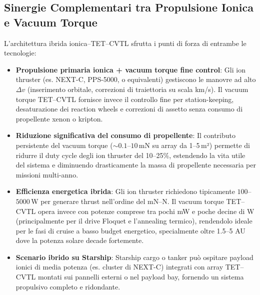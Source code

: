 \documentclass[11pt,a4paper]{article}
\theoremstyle{plain}
\theoremstyle{definition}
\begin{document}
\vspace{0.7cm}



\subsection{Sinergie Complementari tra Propulsione Ionica e Vacuum Torque}

\vspace{0.2cm}

L'architettura ibrida ionica–TET--CVTL sfrutta i punti di forza di entrambe le tecnologie:


\vspace{0.4cm}

\begin{itemize}
    \item \textbf{Propulsione primaria ionica + vacuum torque fine control}:  
    Gli ion thruster (es. NEXT-C, PPS-5000, o equivalenti) gestiscono le manovre ad alto $\Delta v$ (inserimento orbitale, correzioni di traiettoria su scala km/s). Il vacuum torque TET--CVTL fornisce invece il controllo fine per station-keeping, desaturazione dei reaction wheels e correzioni di assetto senza consumo di propellente xenon o kripton.

    \vspace{0.3cm}

    \item \textbf{Riduzione significativa del consumo di propellente}:  
    Il contributo persistente del vacuum torque ($\sim 0.1$–$10$\,mN su array da 1–5\,m²) permette di ridurre il duty cycle degli ion thruster del 10–25\%, estendendo la vita utile del sistema e diminuendo drasticamente la massa di propellente necessaria per missioni multi-anno.

    \vspace{0.3cm}

    \item \textbf{Efficienza energetica ibrida}:  
    Gli ion thruster richiedono tipicamente $100$–$5000$\,W per generare thrust nell'ordine del mN–N. Il vacuum torque TET--CVTL opera invece con potenze comprese tra pochi mW e poche decine di W (principalmente per il drive Floquet e l'annealing termico), rendendolo ideale per le fasi di cruise a basso budget energetico, specialmente oltre 1.5–5 AU dove la potenza solare decade fortemente.

    
\vspace{0.3cm}


    \item \textbf{Scenario ibrido su Starship}:  
    Starship cargo o tanker può ospitare payload ionici di media potenza (es. cluster di NEXT-C) integrati con array TET--CVTL montati sui pannelli esterni o nel payload bay, fornendo un sistema propulsivo completo e ridondante.
\end{itemize}
\end{document}
